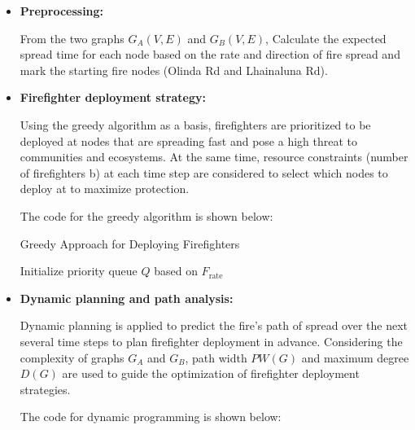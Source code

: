 \documentclass[12pt]{article}  %
\begin{document}
\begin{itemize}
	\setlength{\parsep}{0ex} 
	\setlength{\topsep}{2ex} 
	\setlength{\itemsep}{1ex} 
	\item \textbf{Preprocessing:} 
	
	From the two graphs $G_A(V, E)$ and $G_B(V, E)$, Calculate the expected spread time for each node based on the rate and direction of fire spread and mark the starting fire nodes (Olinda Rd and Lhainaluna Rd).
	
	\item \textbf{Firefighter deployment strategy:} 
	
	Using the greedy algorithm as a basis, firefighters are prioritized to be deployed at nodes that are spreading fast and pose a high threat to communities and ecosystems. At the same time, resource constraints (number of firefighters b) at each time step are considered to select which nodes to deploy at to maximize protection.
	
	The code for the greedy algorithm is shown below:
	
	\noindent\hspace{-2em}
	\begin{algorithm}[H]
		\DontPrintSemicolon %
		\caption{Greedy Approach for Deploying Firefighters}
		\BlankLine
		\SetAlgoLined %
		Initialize priority queue $Q$ based on $F_{\text{rate}}$\;
	\end{algorithm}
	
	\item \textbf{Dynamic planning and path analysis:} 
	
	Dynamic planning is applied to predict the fire's path of spread over the next several time steps to plan firefighter deployment in advance. Considering the complexity of graphs $G_A$ and $G_B$, path width $PW(G)$ and maximum degree $D(G)$ are used to guide the optimization of firefighter deployment strategies.
	
	The code for dynamic programming is shown below:
	

\end{itemize}
\end{document}
